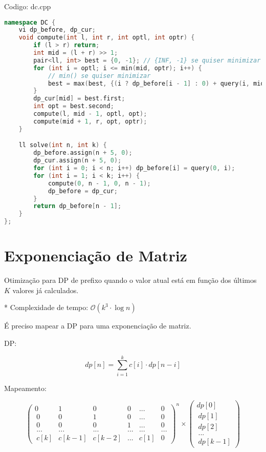 \documentclass[10pt, a4paper, oneside]{book}
\begin{document}
Codigo: dc.cpp

\begin{lstlisting}[language=C++]
namespace DC {
    vi dp_before, dp_cur;
    void compute(int l, int r, int optl, int optr) {
        if (l > r) return;
        int mid = (l + r) >> 1;
        pair<ll, int> best = {0, -1}; // {INF, -1} se quiser minimizar
        for (int i = optl; i <= min(mid, optr); i++) {
            // min() se quiser minimizar
            best = max(best, {(i ? dp_before[i - 1] : 0) + query(i, mid), i});
        }
        dp_cur[mid] = best.first;
        int opt = best.second;
        compute(l, mid - 1, optl, opt);
        compute(mid + 1, r, opt, optr);
    }

    ll solve(int n, int k) {
        dp_before.assign(n + 5, 0);
        dp_cur.assign(n + 5, 0);
        for (int i = 0; i < n; i++) dp_before[i] = query(0, i);
        for (int i = 1; i < k; i++) {
            compute(0, n - 1, 0, n - 1);
            dp_before = dp_cur;
        }
        return dp_before[n - 1];
    }
};
\end{lstlisting}
\hfill

\section{Exponenciação de Matriz}


Otimização para DP de prefixo quando o valor atual está em função dos últimos $K$ valores já calculados.   



* Complexidade de tempo: $\mathcal{O}(k^3 \cdot \log n)$



É preciso mapear a DP para uma exponenciação de matriz.



\textbf{} 


DP:   



$$ dp[n] = \sum_{i=1}^{k} c[i] \cdot dp[n - i] $$ 



Mapeamento:   



$$ \begin{pmatrix} 0&1&0&0&...&0 \\\ 0&0&1&0&...&0 \\\ 0&0&0&1&...&0 \\\ ...&...&...&...&...&... \\\ c[k]&c[k-1]&c[k-2]&...&c[1]&0 \end{pmatrix}^n \times \begin{pmatrix} dp[0] \\\ dp[1] \\\ dp[2] \\\ ... \\\ dp[k-1] \end{pmatrix} $$
\end{document}
